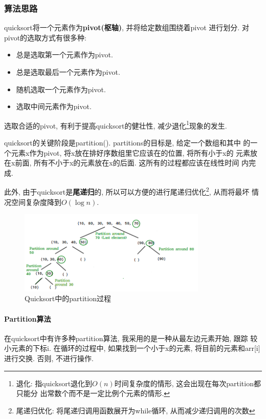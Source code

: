 \subsubsection{算法思路}
quicksort将一个元素作为\textbf{pivot(枢轴)}, 并将给定数组围绕着pivot
进行划分. 对pivot的选取方式有很多种:
\begin{itemize}
	\item 总是选取第一个元素作为pivot.
	\item 总是选取最后一个元素作为pivot.
	\item 随机选取一个元素作为pivot.
	\item 选取中间元素作为pivot.
\end{itemize}
选取合适的pivot, 有利于提高quicksort的健壮性, 减少退化\footnote{退化:
	指quicksort退化到$O(n)$时间复杂度的情形, 这会出现在每次partition都只能分
	出常数个而不是一定比例个元素的情形.}现象的发生.\par
quicksort的关键阶段是partition(). partitions的目标是, 给定一个数组和其中
的一个元素x作为pivot, 将x放在排好序数组里它应该在的位置, 将所有小于x的
元素放在x前面, 所有不小于x的元素放在x的后面. 这所有的过程都应该在线性时间
内完成. \par
此外, 由于quicksort是\textbf{尾递归}的, 所以可以方便的进行尾递归优化\footnote{
	尾递归优化: 将尾递归调用函数展开为while循环, 从而减少递归调用的次数}, 从而将最坏
情况空间复杂度降到$O(\log{n})$.
\begin{figure}[h!]
	\centering
	\label{fig:QuickSort2}
	\includegraphics[width=0.8\textwidth]{figures/QuickSort2.png}
	\caption{Quicksort中的partition过程}
\end{figure}
\paragraph{Partition算法}
在quicksort中有许多种partition算法, 我采用的是一种从最左边元素开始, 跟踪
较小元素的下标i. 在循环的过程中, 如果找到一个小于x的元素,
将目前的元素和arr[i]进行交换. 否则, 不进行操作.

